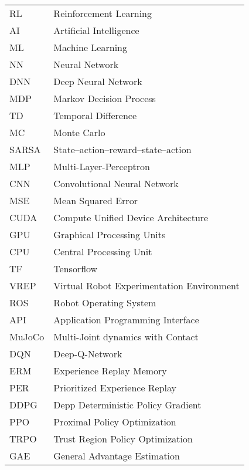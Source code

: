 \bgroup
\def\arraystretch{1.5}
\begin{longtable}{p{} p{}}
  RL & Reinforcement Learning \\
  AI & Artificial Intelligence \\
  ML & Machine Learning\\
  NN & Neural Network\\
  DNN & Deep Neural Network\\
  MDP & Markov Decision Process\\
  TD & Temporal Difference\\
  MC & Monte Carlo\\
  SARSA & State–action–reward–state–action\\
  MLP & Multi-Layer-Perceptron\\
  CNN & Convolutional Neural Network\\
  MSE & Mean Squared Error\\
  CUDA & Compute Unified Device Architecture\\
  GPU & Graphical Processing Units\\
  CPU & Central Processing Unit\\
  TF & Tensorflow\\
  VREP & Virtual Robot Experimentation Environment\\
  ROS & Robot Operating System\\
  API & Application Programming Interface\\
  MuJoCo & Multi-Joint dynamics with Contact\\
  DQN & Deep-Q-Network\\
  ERM & Experience Replay Memory\\
  PER & Prioritized Experience Replay\\
  DDPG & Depp Deterministic Policy Gradient\\
  PPO & Proximal Policy Optimization\\
  TRPO & Trust Region Policy Optimization\\
  GAE & General Advantage Estimation\\
\end{longtable}
\egroup
